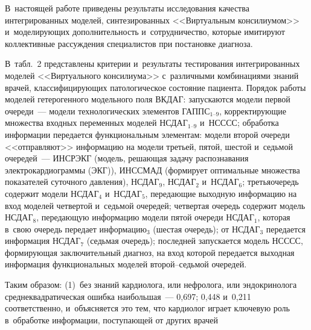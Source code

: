 \begin{multicols}{2}
В~настоящей работе приведены результаты исследования качества 
интегрированных моделей, синтезированных <<Виртуальным консилиумом>>\linebreak 
и~моделирующих дополнительность и~сотрудничество, которые имитируют коллективные 
рас\-суж\-де\-ния специалистов при постановке диагноза. 

В~табл.~2 представлены критерии 
и~результаты тес\-ти\-ро\-ва\-ния интегрированных моделей <<Виртуального консилиума>> 
с~различными комбинациями знаний врачей, классифицирующих патологическое состояние 
пациента. Порядок работы моделей гетерогенного модельного поля \mbox{ВКДАГ}: запускаются 
модели первой очереди~--- модели технологических элементов {ГАППС}$_{1\mbox{--}9}$, 
корректирующие множества входных переменных моделей {НСДАГ}$_{1\mbox{--}9}$ 
и~{НСССС}; обработка информации передается функциональным элементам: модели 
второй очереди <<отправляют>> информацию на модели третьей, пятой, шес\-той и~седьмой 
очередей~--- \mbox{ИНСРЭКГ} (модель, решающая задачу распознавания электрокардиограммы (ЭКГ)), 
{ИНССМАД} (формирует оптимальные множества показателей суточного давления), 
{НСДАГ}$_9$, {НСДАГ}$_2$ и~{НСДАГ}$_6$; третья\linebreak очередь содержит 
модели НСДАГ$_4$ и~НСДАГ$_5$, передающие выходную информацию на вход моделей четвертой 
и~седьмой очередей; четвертая очередь содержит модель {НСДАГ}$_8$, пе\-ре\-да\-ющую 
информацию  модели пятой очереди {НСДАГ}$_1$, которая в~свою очередь передает 
информацию$_3$ (шес\-тая очередь); от {НСДАГ}$_3$ передается 
информация {НСДАГ}$_7$ (седьмая очередь); последней запускается модель 
{НСССС}, формирующая заключительный диагноз, на вход которой передается 
выходная информация функциональных моделей вто\-рой--седь\-мой очередей.
  
  Таким образом: (1)~без знаний кардиолога, или нефролога, или эндокринолога 
сред\-не\-квад\-ратическая ошибка наибольшая~--- 0,697; 0,448 и~0,211 соответственно, 
и~объясняется это тем, что кардиолог играет ключевую роль в~обработке ин\-формации, 
поступающей от других врачей\linebreak\vspace*{-12pt}


\pagebreak

\end{multicols}

